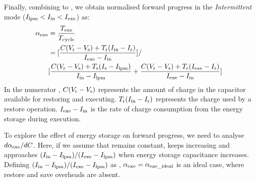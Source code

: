 Finally, combining  to , we obtain normalised forward progress  in the \textit{Intermittent} mode ($I_{\text{lpm}} < I_{\text{in}} < I_{\text{exe}}$) as:
\begin{equation}
    \begin{aligned}
        \alpha_{\text{exe}} &= \frac{T_{\text{exe}}}{T_{\text{cycle}}} \\
        &= [\frac{C (V_{\text{r}} - V_{\text{s}}) + T_{\text{r}} (I_{\text{in}} - I_{\text{r}})} {I_{\text{exe}} - I_{\text{in}}}] / \\
        & [\frac{C (V_{\text{r}} - V_{\text{s}}) + T_{\text{s}} (I_{\text{s}} - I_{\text{lpm}})}{I_{\text{in}} - I_{\text{lpm}}} + \frac{C (V_{\text{r}} - V_{\text{s}}) + T_{\text{r}} (I_{\text{exe}} - I_{\text{r}})}{I_{\text{exe}} - I_{\text{in}}}] \\
    \end{aligned}
    \label{eq:texepercent}
\end{equation}
In the numerator , $C(V_{\text{r}} - V_{\text{s}})$ represents the amount of charge in the capacitor available for restoring and executing. $T_{\text{r}} (I_{\text{in}} - I_{\text{r}})$ represents the charge used by a restore operation. $I_{\text{exe}} - I_{\text{in}}$ is the rate of charge consumption from the energy storage during execution.


To explore the effect of energy storage on forward progress, we need to analyse $d\alpha_{\text{exe}} / dC$. Here, if we assume that  remains constant,  keeps increasing and approaches $(I_{\text{in}} - I_{\text{lpm}}) / (I_{\text{exe}} - I_{\text{lpm}})$ when energy storage capacitance  increases. Defining $(I_{\text{in}} - I_{\text{lpm}}) / (I_{\text{exe}} - I_{\text{lpm}})$ as , $\alpha_{\text{exe}} = \alpha_{\text{exe\_ideal}}$ is an ideal case, where restore and save overheads are absent.

